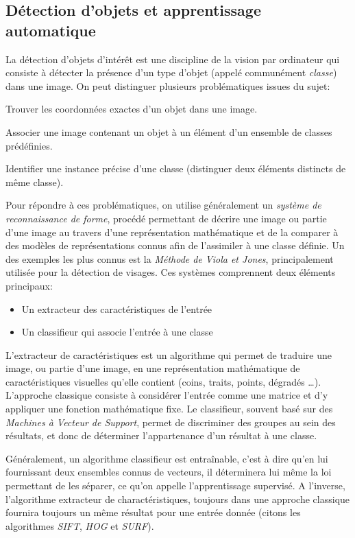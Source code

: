 		\subsection{Détection d'objets et apprentissage automatique}
			
			La détection d'objets d'intérêt est une discipline de la vision par ordinateur qui consiste à détecter la présence d'un type d'objet (appelé communément \emph{classe}) dans une image. On peut distinguer plusieurs problématiques issues du sujet:
			\begin{description}[noitemsep]
				\item[Localisation:] Trouver les coordonnées exactes d'un objet dans une image.
				\item[Classification:] Associer une image contenant un objet à un élément d'un ensemble de classes prédéfinies.
				\item[Reconnaissance:] Identifier une instance précise d'une classe (distinguer deux éléments distincts de même classe).
			\end{description}
			Pour répondre à ces problématiques, on utilise généralement un \emph{système de reconnaissance de forme}, procédé permettant de décrire une image ou partie d'une image au travers d'une représentation mathématique et de la comparer à des modèles de représentations connus afin de l'assimiler à une classe définie. Un des exemples les plus connus est la \emph{Méthode de Viola et Jones}\cite{viola}, principalement utilisée pour la détection de visages. Ces systèmes comprennent deux éléments principaux:
			\begin{itemize}[noitemsep]
				\item Un extracteur des caractéristiques de l'entrée
				\item Un classifieur qui associe l'entrée à une classe
			\end{itemize}
			L'extracteur de caractéristiques est un algorithme qui permet de traduire une image, ou partie d'une image, en une représentation mathématique de caractéristiques visuelles qu'elle contient (coins, traits, points, dégradés \dots). L'approche classique consiste à considérer l'entrée comme une matrice et d'y appliquer une fonction mathématique fixe.
			Le classifieur, souvent basé sur des \emph{Machines à Vecteur de Support}\cite{svm}, permet de discriminer des groupes au sein des résultats, et donc de déterminer l'appartenance d'un résultat à une classe.
			\par
			Généralement, un algorithme classifieur est entraînable, c'est à dire qu'en lui fournissant deux ensembles connus de vecteurs, il déterminera lui même la loi permettant de les séparer, ce qu'on appelle l'apprentissage supervisé. A l'inverse, l'algorithme extracteur de charactéristiques, toujours dans une approche \og classique \fg{} fournira toujours un même résultat pour une entrée donnée (citons les algorithmes \emph{SIFT}\cite{sift}, \emph{HOG}\cite{hog} et \emph{SURF}\cite{surf}).
			
